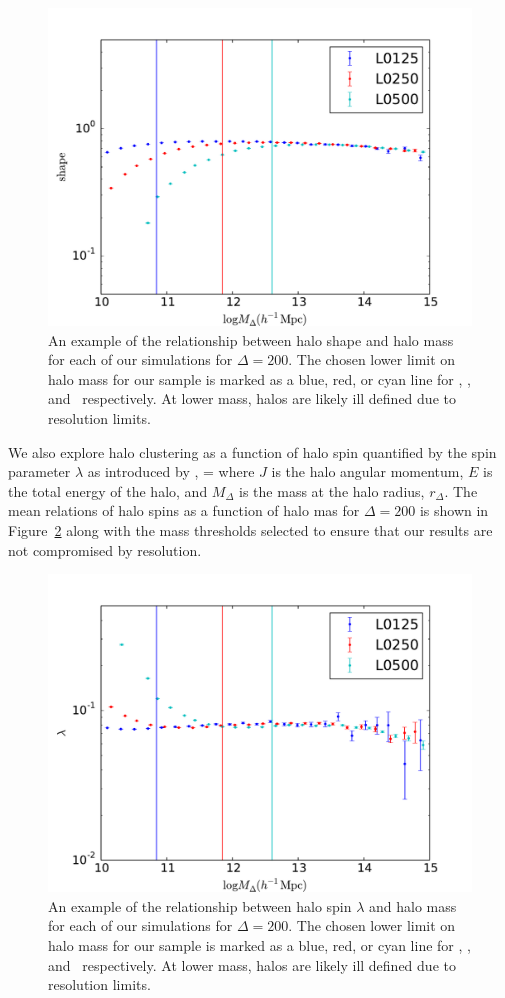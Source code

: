 \documentclass[usenatbib,usegraphicx,letterpaper]{mn2e}
\begin{document}
\begin{figure}
\centering
\includegraphics[width=.5\textwidth]{masscut_shape_d200.pdf}
\caption{An example of the relationship between halo shape and halo mass for each of our simulations for $\Delta =200$. The chosen lower limit on halo mass for our sample is marked as a blue, red, or cyan line for \simA, \simB, and \simC \ respectively. At lower mass, halos are likely ill defined due to resolution limits.}
\label{fig:srelation}
\end{figure}

We also explore halo clustering as a function of halo spin quantified by the spin parameter $\lambda$ as introduced by \citep{peebles69},
\beq
\lambda = 
\eeq
where $J$ is the halo angular momentum, $E$ is the total energy of the halo, and $M_{\Delta}$ is the mass at the halo radius, $r_{\Delta}$. The mean relations of halo spins as a function of halo mas for $\Delta=200$ is shown in Figure~\ref{fig:spinrelation} along with the mass thresholds selected to ensure that our results are not compromised by resolution.

\begin{figure}
\centering
\includegraphics[width=.5\textwidth]{masscut_spin_d200.pdf}
\caption{An example of the relationship between halo spin $\lambda$ and halo mass for each of our simulations for $\Delta =200$. The chosen lower limit on halo mass for our sample is marked as a blue, red, or cyan line for \simA, \simB, and \simC \ respectively. At lower mass, halos are likely ill defined due to resolution limits.}
\label{fig:spinrelation}
\end{figure}
\end{document}
